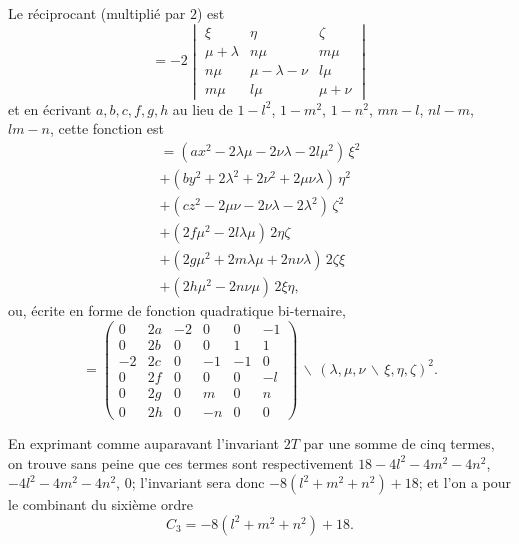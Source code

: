 \documentclass[11pt,a4paper]{article}
\theoremstyle{definition}
\begin{document}
Le r\'{e}ciprocant (multipli\'{e} par $2$) est
\[=-2\begin{vmatrix}\xi & \eta & \zeta \\ \mu+\lambda & n\mu & m\mu \\ n\mu & \mu-\lambda-\nu & l\mu \\ m\mu & l\mu & \mu+\nu\end{vmatrix}\]
et en \'{e}crivant $a,b,c,f,g,h$ au lieu de $1-l^{2}$, $1-m^{2}$, $1-n^{2}$, $mn-l$, $nl-m$,
$lm-n$, cette fonction est
\begin{multline*}
= (ax^{2} - 2\lambda\mu - 2\nu\lambda - 2l\mu^{2})\,\xi^{2} \\
+ (by^{2} + 2\lambda^{2} + 2\nu^{2} + 2\mu\nu\lambda)\,\eta^{2} \\
+ (cz^{2} - 2\mu\nu - 2\nu\lambda - 2\lambda^{2})\,\zeta^{2} \\
+ (2f\mu^{2} - 2l\lambda\mu)\,2\eta\zeta \\
+ (2g\mu^{2} + 2m\lambda\mu + 2n\nu\lambda)\,2\zeta\xi \\
+ (2h\mu^{2} - 2n\nu\mu)\,2\xi\eta,
\end{multline*}
ou, \'{e}crite en forme de fonction quadratique bi-ternaire,
\[
= \begin{pmatrix}
0 & 2a & -2 & 0 & 0 & -1 \\
0 & 2b & 0 & 0 & 1 & 1 \\
-2 & 2c & 0 & -1 & -1 & 0 \\
0 & 2f & 0 & 0 & 0 & -l \\
0 & 2g & 0 & m & 0 & n \\
0 & 2h & 0 & -n & 0 & 0
\end{pmatrix}\!\!\,\backslash\!\!\,(\lambda,\mu,\nu\,\backslash\!\!\,\xi,\eta,\zeta)^{2}.
\]

\newpage

En exprimant comme auparavant l'invariant $2T$ par une somme de cinq termes, on trouve
sans peine que ces termes sont respectivement $18-4l^{2}-4m^{2}-4n^{2}$,
$-4l^{2}-4m^{2}-4n^{2}$, $0$; l'invariant sera donc $-8(l^{2}+m^{2}+n^{2})+18$;
et l'on a pour le combinant du sixi\`{e}me ordre
\[C_{3} = -8(l^{2}+m^{2}+n^{2})+18.\]
\end{document}
